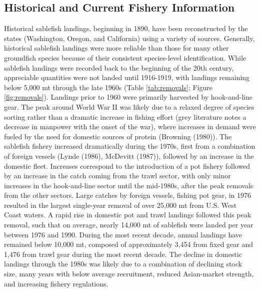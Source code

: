 \documentclass[11pt,
  english,
  a4paper,
]{article}
\begin{document}

\hypertarget{historical-and-current-fishery-information}{%
\subsection{Historical and Current Fishery Information}\label{historical-and-current-fishery-information}}

\leavevmode\tagmcend\tagstructend


Historical sablefish landings, beginning in 1890, have been reconstructed by the states (Washington, Oregon, and California) using a variety of sources. Generally, historical sablefish landings were more reliable than those for many other groundfish species because of their consistent species-level identification. While sablefish landings were recorded back to the beginning of the 20th century, appreciable quantities were not landed until 1916-1919, with landings remaining below 5,000 mt through the late 1960s (Table \ref{tab:removals}; Figure \ref{fig:removals}). Landings prior to 1960 were primarily harvested by hook-and-line gear. The peak around World War II was likely due to a relaxed degree of species sorting rather than a dramatic increase in fishing effort (grey literature notes a decrease in manpower with the onset of the war), where increases in demand were fueled by the need for domestic sources of protein ({Browning (1980)\leavevmode\tagmcend\tagstructend}). The sablefish fishery increased dramatically during the 1970s, first from a combination of foreign vessels ({Lynde (1986)\leavevmode\tagmcend\tagstructend}, {McDevitt (1987)\leavevmode\tagmcend\tagstructend}), followed by an increase in the domestic fleet. Increases correspond to the introduction of a pot fishery followed by an increase in the catch coming from the trawl sector, with only minor increases in the hook-and-line sector until the mid-1980s, after the peak removals from the other sectors. Large catches by foreign vessels, fishing pot gear, in 1976 resulted in the largest single-year removal of over 25,000 mt from U.S. West Coast waters. A rapid rise in domestic pot and trawl landings followed this peak removal, such that on average, nearly 14,000 mt of sablefish were landed per year between 1976 and 1990. During the most recent decade, annual landings have remained below 10,000 mt, composed of approximately 3,454 from fixed gear and 1,476 from trawl gear during the most recent decade. The decline in domestic landings through the 1980s was likely due to a combination of declining stock size, many years with below average recruitment, reduced Asian-market strength, and increasing fishery regulations.
\end{document}
